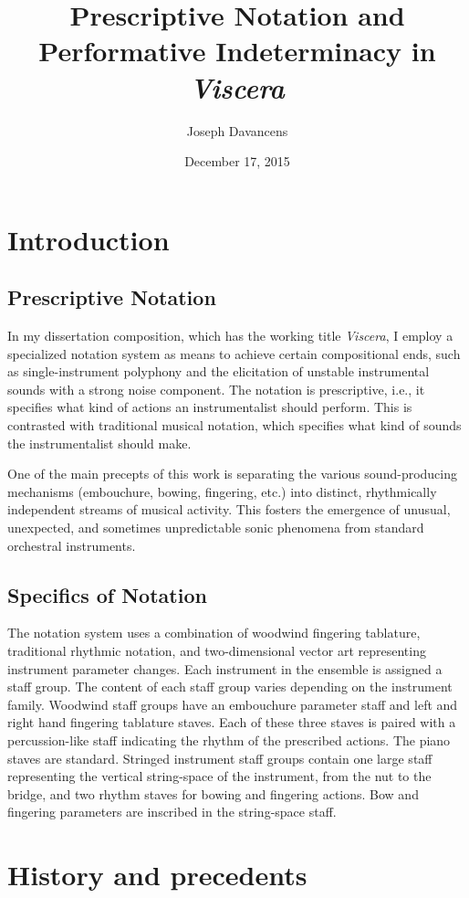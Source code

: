 \documentclass[11pt]{article}
\title{Prescriptive Notation and Performative Indeterminacy in \textit{Viscera}}
\author{Joseph Davancens}
\date{December 17, 2015}
\begin{document}
\maketitle

\section{Introduction}
\subsection{Prescriptive Notation}
In my dissertation composition, which has the working title \textit{Viscera}, I employ a specialized notation system as means to achieve certain compositional ends, such as single-instrument polyphony and the elicitation of unstable instrumental sounds with a strong noise component.  The notation is prescriptive, i.e., it specifies what kind of actions an instrumentalist should perform. This is contrasted with traditional musical notation, which specifies what kind of sounds the instrumentalist should make.

One of the main precepts of this work is separating the various sound-producing mechanisms (embouchure, bowing, fingering, etc.) into distinct, rhythmically independent streams of musical activity. This fosters the emergence of unusual, unexpected, and sometimes unpredictable sonic phenomena from standard orchestral instruments.

\subsection{Specifics of Notation}
The notation system uses a combination of woodwind fingering tablature, traditional rhythmic notation, and two-dimensional vector art representing instrument parameter changes. Each instrument in the ensemble is assigned a staff group. The content of each staff group varies depending on the instrument family. Woodwind staff groups have an embouchure parameter staff and left and right hand fingering tablature staves. Each of these three staves is paired with a percussion-like staff indicating the rhythm of the prescribed actions. The piano staves are standard. Stringed instrument staff groups contain one large staff representing the vertical string-space of the instrument, from the nut to the bridge, and two rhythm staves for bowing and fingering actions. Bow and fingering parameters are inscribed in the string-space staff.

\section{History and precedents}
\end{document}

